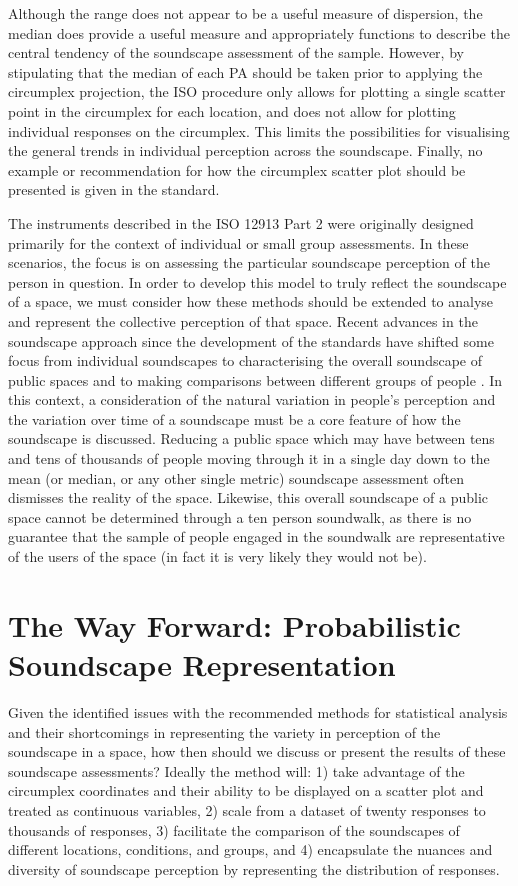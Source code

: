 Although the range does not appear to be a useful measure of dispersion, the median does provide a useful measure and appropriately functions to describe the central tendency of the  soundscape assessment of the sample. However, by stipulating that the median of each PA should be taken prior to applying the circumplex projection, the ISO procedure only allows for plotting a single scatter point in the circumplex for each location, and does not allow for plotting individual responses on the circumplex. This limits the possibilities for visualising the general trends in individual perception across the soundscape. Finally, no example or recommendation for how the circumplex scatter plot should be presented is given in the standard.

The instruments described in the ISO 12913 Part 2 \citep{ISO12913Part2} were originally designed primarily for the context of individual or small group assessments. In these scenarios, the focus is on assessing the particular soundscape perception of the person in question. In order to develop this model to truly reflect the soundscape of a space, we must consider how these methods should be extended to analyse and represent the collective perception of that space. Recent advances in the soundscape approach since the development of the standards have shifted some focus from individual soundscapes to characterising the overall soundscape of public spaces \citep{Mitchell2020Soundscape} and to making comparisons between different groups of people \citep{Jeon2018cross}. In this context, a consideration of the natural variation in people's perception and the variation over time of a soundscape must be a core feature of how the soundscape is discussed. Reducing a public space which may have between tens and tens of thousands of people moving through it in a single day down to the mean (or median, or any other single metric) soundscape assessment often dismisses the reality of the space. Likewise, this overall soundscape of a public space cannot be determined through a ten person soundwalk, as there is no guarantee that the sample of people engaged in the soundwalk are representative of the users of the space (in fact it is very likely they would not be).

\section{The Way Forward: Probabilistic Soundscape Representation}
Given the identified issues with the recommended methods for statistical analysis and their shortcomings in representing the variety in perception of the soundscape in a space, how then should we discuss or present the results of these soundscape assessments? Ideally the method will: 1) take advantage of the circumplex coordinates and their ability to be displayed on a scatter plot and treated as continuous variables, 2) scale from a dataset of twenty responses to thousands of responses, 3) facilitate the comparison of the soundscapes of different locations, conditions, and groups, and 4) encapsulate the nuances and diversity of soundscape perception by representing the distribution of responses.


